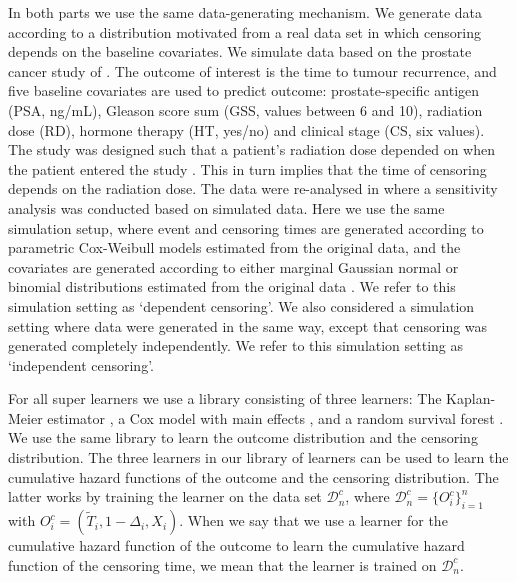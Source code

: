 \documentclass[lineno]{biometrika}
\newcommand{\1}{\mathds{1}}
\newcommand{\data}{\ensuremath{\mathcal{D}}}
\begin{document}
In both parts we use the same data-generating mechanism. We generate data
according to a distribution motivated from a real data set in which censoring
depends on the baseline covariates. We simulate data based on the prostate
cancer study of \cite{kattan2000pretreatment}. The outcome of interest is the
time to tumour recurrence, and five baseline covariates are used to predict
outcome: prostate-specific antigen (PSA, ng/mL), Gleason score sum (GSS, values
between 6 and 10), radiation dose (RD), hormone therapy (HT, yes/no) and
clinical stage (CS, six values). The study was designed such that a patient's
radiation dose depended on when the patient entered the study
\citep{gerds2013estimating}. This in turn implies that the time of censoring
depends on the radiation dose. The data were re-analysed in
\citep{gerds2013estimating} where a sensitivity analysis was conducted based on
simulated data. Here we use the same simulation setup, where event and censoring
times are generated according to parametric Cox-Weibull models estimated from
the original data, and the covariates are generated according to either marginal
Gaussian normal or binomial distributions estimated from the original data
\citep[c.f.,][Section~4.6]{gerds2013estimating}. We refer to this simulation
setting as `dependent censoring'. We also considered a simulation setting where
data were generated in the same way, except that censoring was generated
completely independently. We refer to this simulation setting as `independent
censoring'.

For all super learners we use a library consisting of three
learners: The Kaplan-Meier estimator
\citep{kaplan1958nonparametric,Gerds_2019prodlim}, a Cox model
with main effects \citep{cox1972regression, survival-package},
and a random survival forest
\citep{ishwaran2008random,randomForestSRC}. We use the same
library to learn the outcome distribution and the censoring
distribution. The three learners in our library of
learners can be used to learn the cumulative hazard functions
of the outcome and the censoring distribution. The latter
works by training the learner on the data set \( \data_n^c \),
where \( \data_n^c = \{O_i^c\}_{i=1}^n \) with
\( O_i^c = (\tilde{T}_i, 1-\Delta_i, X_i) \). When we say that
we use a learner for the cumulative hazard function of the
outcome to learn the cumulative hazard function of the
censoring time, we mean that the learner is trained on
\( \data_n^c \).
\end{document}
